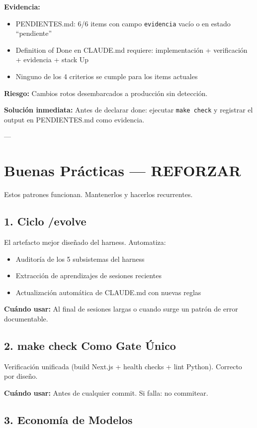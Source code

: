 \documentclass[12pt,a4paper,spanish]{article}
\begin{document}
\textbf{Evidencia:}
\begin{itemize}
  \item PENDIENTES.md: 6/6 items con campo \texttt{evidencia} vacío o en estado ``pendiente''
  \item Definition of Done en CLAUDE.md requiere: implementación + verificación + evidencia + stack Up
  \item Ninguno de los 4 criterios se cumple para los items actuales
\end{itemize}

\textbf{Riesgo:} Cambios rotos desembarcados a producción sin detección.

\textbf{Solución inmediata:}
Antes de declarar done: ejecutar \texttt{make check} y registrar el output en PENDIENTES.md como evidencia.

---

\section{Buenas Prácticas — REFORZAR}

Estos patrones funcionan. Mantenerlos y hacerlos recurrentes.

\subsection{1. Ciclo /evolve}

El artefacto mejor diseñado del harness. Automatiza:
\begin{itemize}
  \item Auditoría de los 5 subsistemas del harness
  \item Extracción de aprendizajes de sesiones recientes
  \item Actualización automática de CLAUDE.md con nuevas reglas
\end{itemize}

\textbf{Cuándo usar:} Al final de sesiones largas o cuando surge un patrón de error documentable.

\subsection{2. make check Como Gate Único}

Verificación unificada (build Next.js + health checks + lint Python). Correcto por diseño.

\textbf{Cuándo usar:} Antes de cualquier commit. Si falla: no commitear.

\subsection{3. Economía de Modelos}
\end{document}
